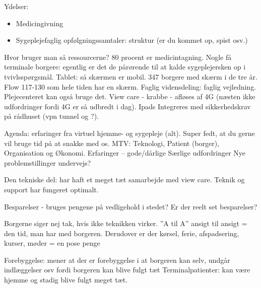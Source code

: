 Ydelser:
\begin{itemize}
	\item Medicingivning 
	\item Sygeplejefaglig opfølgningssamtaler: struktur (er du kommet op, spist osv.)
\end{itemize}

Hvor bruger man så ressourcerne? 
80 procent er medicintagning. 
Nogle få terminale borgere: egentlig er det de pårørende til at kalde sygeplejersken op i tvivlsspørgsmål. Tablet: så skærmen er mobil. 
347 borgere med skærm i de tre år. 
Flow 117-130 som hele tiden har en skærm. 
Faglig vidensdeling: faglig vejledning. Plejecenteret kan også bruge det. 
View care - krabbe - afløses af 4G (næsten ikke udfordringer fordi 4G er så udbredt i dag). 
Ipads 
Integreres med sikkerhedskrav på rådhuset (vpn tunnel og ?). 

Agenda: erfaringer fra virtuel hjemme- og sygepleje (alt). 
Super fedt, at du gerne vil bruge tid på at snakke med os.
MTV: Teknologi, Patient (borger), Organisation og Økonomi. 
Erfaringer – gode/dårlige
Særlige udfordringer
Nye problemstillinger undervejs? 

Den tekniske del: har haft et meget tæt samarbejde med view care. Teknik og support har fungeret optimalt. 

Besparelser - bruges pengene på vedligehold i stedet? Er der reelt set besparelser? 

Borgerne siger nej tak, hvis ikke teknikken virker.  
”A til A” ansigt til ansigt = den tid, man har med borgeren. 
Derudover er der kørsel, ferie, afspadsering, kurser, møder = en pose penge

Forebyggelse: mener at der er forebyggelse i at borgeren kan selv, undgår indlæggelser osv fordi borgeren kan blive fulgt tæt
Terminalpatienter: kan være hjemme og stadig blive fulgt meget tæt. 

